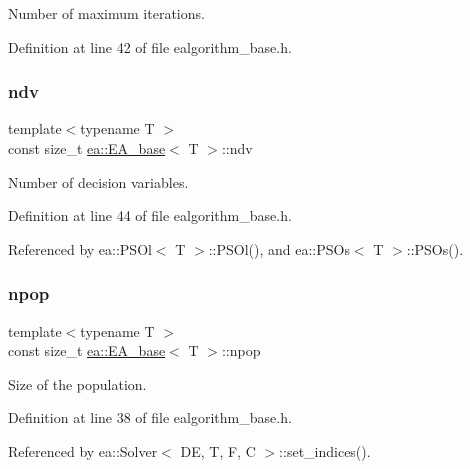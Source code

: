 Number of maximum iterations. 



Definition at line 42 of file ealgorithm\+\_\+base.\+h.

\mbox{\label{structea_1_1_e_a__base_a6996abed1c0b9642bdae67547fa6474c}} 
\subsubsection{\texorpdfstring{ndv}{ndv}}
{\footnotesize\ttfamily template$<$typename T $>$ \\
const size\+\_\+t \hyperlink{structea_1_1_e_a__base}{ea\+::\+E\+A\+\_\+base}$<$ T $>$\+::ndv}



Number of decision variables. 



Definition at line 44 of file ealgorithm\+\_\+base.\+h.



Referenced by ea\+::\+P\+S\+Ol$<$ T $>$\+::\+P\+S\+Ol(), and ea\+::\+P\+S\+Os$<$ T $>$\+::\+P\+S\+Os().

\mbox{\label{structea_1_1_e_a__base_a41b6ed30e866d5f6a782a90e6a1b0f79}} 
\subsubsection{\texorpdfstring{npop}{npop}}
{\footnotesize\ttfamily template$<$typename T $>$ \\
const size\+\_\+t \hyperlink{structea_1_1_e_a__base}{ea\+::\+E\+A\+\_\+base}$<$ T $>$\+::npop}



Size of the population. 



Definition at line 38 of file ealgorithm\+\_\+base.\+h.



Referenced by ea\+::\+Solver$<$ D\+E, T, F, C $>$\+::set\+\_\+indices().

\mbox{\label{structea_1_1_e_a__base_a9ad71465eab92ffd0fe98b625d2d15bc}} 
